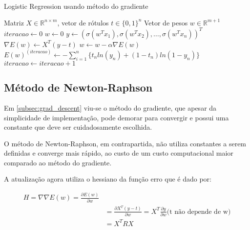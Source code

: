 \begin{algorithm}[H]
	\caption{Logistic Regression usando método do gradiente}
	\begin{algorithmic}[1]
		\REQUIRE Matriz $ X \in \mathbb{R}^{n \times m} $, 
		vetor de rótulos $t \in \{0, 1\}^n$
		\ENSURE Vetor de pesos $w \in \mathbb{R}^{m + 1}$
		\STATE $iteracao \leftarrow 0$
		\STATE $w \leftarrow 0$
			\STATE $y \leftarrow (\sigma(w^Tx_1), \sigma(w^Tx_2), \ldots, \sigma(w^Tx_n))^T$ 
			\STATE $\nabla E(w) \leftarrow X^T(y - t)$ 
			\STATE $w \leftarrow w - \alpha \nabla E(w)$ 
			\STATE $E(w)^{ (iteracao) } \leftarrow 
			- \sum_{i = 1}^{n} \{ t_nln(y_n) + (1 - t_n) ln(1 - y_n) \}$ 
			\STATE $iteracao \leftarrow iteracao + 1$
		\ENDWHILE
	\end{algorithmic}
\end{algorithm}

\subsection{Método de Newton-Raphson}
\label{subsec:newton-raphson}

Em \ref{subsec:grad_descent} viu-se o método do gradiente, que apesar da simplicidade de implementação,
pode demorar para convergir e possui uma constante que deve ser cuidadosamente escolhida.

O método de Newton-Raphson, em contrapartida, não utiliza constantes a serem definidas e
converge mais rápido, ao custo de um custo computacional maior comparado ao método do gradiente.

A atualização agora utiliza o hessiano da função erro que é dado por:

\begin{center}
	\begin{equation}
		\begin{split}
			\label{eq:hessian_error}
			H = \nabla \nabla E(w) = \frac{\partial E(w)}{\partial w} \\
			& = \frac{\partial X^T(y - t)}{\partial w} =  X^T \frac{\partial y}{\partial w} \text{(t não depende de w)} \\
			& = X^TRX
		\end{split}
	\end{equation}
\end{center}

